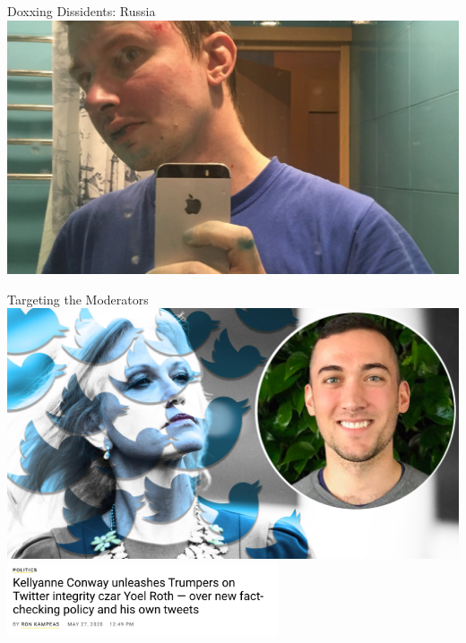 \documentclass[nobackground,dvipsnames,table]{beamer}
\begin{document}
\begin{frame}{Doxxing Dissidents: Russia}
    \includegraphics[width=\textwidth]{russian-dissident}
\end{frame}

\begin{frame}{Targeting the Moderators}
    \includegraphics[width=\textwidth]{conway-roth}
    \includegraphics[width=0.6\textwidth]{conway-roth-headline}
\end{frame}
\end{document}
